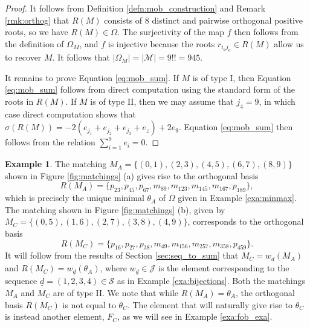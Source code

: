 \documentclass[11pt]{amsart}
\theoremstyle{plain}
\theoremstyle{definition}
\newtheorem{exa}[theorem]{Example}
\theoremstyle{remark}
\numberwithin{equation}{section}
\newcommand{\seqd}{\underline{d}}
\newcommand{\calj}{\mathcal{J}}
\newcommand{\calm}{\mathcal{M}}
\newcommand{\cals}{\mathcal{S}}
\newcommand{\ob}{\Omega}
\newcommand{\mob}{\Omega_M}
\newcommand{\abs}[1]{\lvert #1 \rvert}
\begin{document}
\begin{proof}
It follows from Definition \ref{defn:mob_construction} and Remark
\ref{rmk:orthog} that $R(M)$ consists of 8 distinct and pairwise orthogonal
positive roots, so we have $R(M)\in \ob$. The surjectivity of the map $f$ then
follows from the definition of $\mob$, and $f$ is injective because the roots
$r_{i_aj_a}\in R(M)$ allow us to recover $M$. It follows that
$\abs{\mob}=\abs{\calm}=9!!=945.$

It remains to prove Equation \eqref{eq:mob_sum}. If $M$ is of type I, then
Equation \eqref{eq:mob_sum} follows from direct computation using the standard
form of the roots in $R(M)$. If $M$ is of type II, then we may assume that
$j_4=9$, in which case direct computation shows that
$\sigma(R(M))=-2(e_{j_1}+e_{j_2}+e_{j_3}+e_z)+2e_9$. Equation \eqref{eq:mob_sum}
then follows from the relation $\sum_{i=1}^9e _i = 0$. \end{proof}

\begin{exa}
\label{exa:mob_exa}
The matching $M_A=\{(0,1), (2,3), (4,5), (6,7), (8,9)\}$ shown in Figure
\ref{fig:matchings} (a) gives rise to the orthogonal basis 
\[
R(M_A)= \{p_{23}, p_{45}, p_{67}, m_{89}, m_{123}, m_{145}, m_{167}, p_{189}\},
\]
which is precisely the unique minimal $\theta_A$ of $\ob$ given in Example
\ref{exa:minmax}. The matching shown
in Figure \ref{fig:matchings} (b), given by $M_C=\{(0,5), (1,6), (2,7), (3,8),
(4,9)\}$, corresponds 
to the orthogonal basis
\[
R(M_C)= \{p_{16}, p_{27}, p_{38}, m_{49}, m_{156}, m_{257}, m_{358}, p_{459}\}.
\]
It will follow from the results of Section \ref{sec:seq_to_sum} that
$M_C=w_{\seqd}(M_A)$ and $R(M_C)=w_{\seqd}(\theta_A)$, where $w_{\seqd}\in \calj$ is the element
corresponding to the sequence $\seqd=(1,2,3,4)\in \cals$ as in Example
\ref{exa:bijections}. Both the matchings $M_A$ and $M_C$ are of type II. We note
that while $R(M_A)=\theta_A$, the orthogonal basis $R(M_C)$ is not equal to
$\theta_C$. The element that will naturally give rise to $\theta_C$ is instead
another element, $F_C$, as we will see in Example \ref{exa:fob_exa}.

\end{exa}
\end{document}
